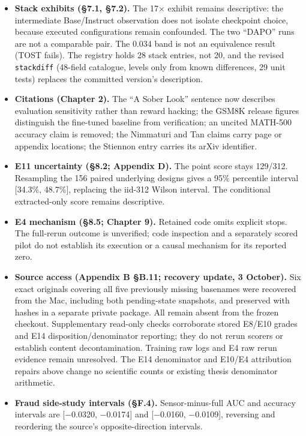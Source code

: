 \documentclass[12pt,a4paper]{report}
\begin{document}
\begin{itemize}
  cannot be recomputed; the ``anti-herding'' δ\_div analysis, its iso-G
  table and the +0.1224 plug-in residual are withdrawn as
  sign-guaranteed (expectation +0.105 under i.i.d. rollouts); the
  withdrawn ρ = 0.27 becomes ρ = −0.37 (p = 0.36) on the eight
  non-simulated cells. Contemporaneous prior work is now cited
  \citep{he2026avspo, nie2026starvation}.
\item
  \textbf{Stack exhibits (§7.1, §7.2).} The 17× exhibit remains
  descriptive: the intermediate Base/Instruct observation does not
  isolate checkpoint choice, because executed configurations remain
  confounded. The two ``DAPO'' runs are not a comparable pair. The 0.034
  band is not an equivalence result (TOST fails). The registry holds 28
  stack entries, not 20, and the revised \texttt{stackdiff} (48-field
  catalogue, levels only from known differences, 29 unit tests) replaces
  the committed version's description.
\item
  \textbf{Citations (Chapter 2).} The ``A Sober Look'' sentence now
  describes evaluation sensitivity rather than reward hacking; the GSM8K
  release figures distinguish the fine-tuned baseline from verification;
  an uncited MATH-500 accuracy claim is removed; the Nimmaturi and Tan
  claims carry page or appendix locations; the Stiennon entry carries
  its arXiv identifier.
\item
  \textbf{E11 uncertainty (§8.2; Appendix D).} The point score stays
  129/312. Resampling the 156 paired underlying designs gives a 95\%
  percentile interval {[}34.3\%, 48.7\%{]}, replacing the iid-312 Wilson
  interval. The conditional extracted-only score remains descriptive.
\item
  \textbf{E4 mechanism (§8.5; Chapter 9).} Retained code omits explicit
  stops. The full-rerun outcome is unverified; code inspection and a
  separately scored pilot do not establish its execution or a causal
  mechanism for its reported zero.
\item
  \textbf{Source access (Appendix B §B.11; recovery update, 3 October).}
  Six exact originals covering all five previously missing basenames
  were recovered from the Mac, including both pending-state snapshots,
  and preserved with hashes in a separate private package. All remain
  absent from the frozen checkout. Supplementary read-only checks
  corroborate stored E8/E10 grades and E14 disposition/denominator
  reporting; they do not rerun scorers or establish content
  decontamination. Training raw logs and E4 raw rerun evidence remain
  unresolved. The E14 denominator and E10/E4 attribution repairs above
  change no scientific counts or existing thesis denominator arithmetic.
\item
  \textbf{Fraud side-study intervals (§F.4).} Sensor-minus-full AUC and
  accuracy intervals are {[}−0.0320, −0.0174{]} and {[}−0.0160,
  −0.0109{]}, reversing and reordering the source's opposite-direction
  intervals.
\end{itemize}
\end{document}
